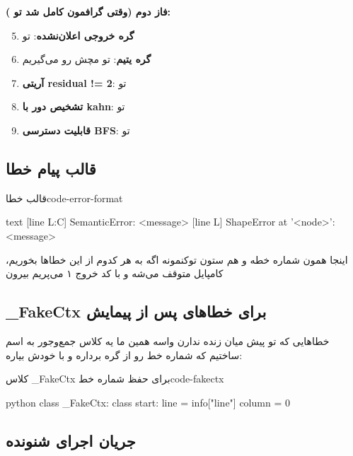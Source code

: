 \documentclass{nngraph-fa}
\begin{document}
\textbf{فاز دوم (وقتی گرافمون کامل شد تو ):}
\begin{enumerate}
    \setcounter{enumi}{4}
    \item \textbf{گره خروجی اعلان‌نشده}: تو 
    \item \textbf{گره یتیم}: تو  مچش رو می‌گیریم
    \item \textbf{آریتی residual != 2}: تو 
    \item \textbf{تشخیص دور با kahn}: تو 
    \item \textbf{قابلیت دسترسی BFS}: تو 
\end{enumerate}

\subsection{قالب پیام خطا}

\begin{codebox}{قالب خطا}{code-error-format}
\begin{amzcode}{text}
[line L:C] SemanticError: <message>
[line L] ShapeError at '<node>': <message>
\end{amzcode}
\end{codebox}

اینجا  همون شماره خطه و  هم ستون توکنمونه
اگه به هر کدوم از این خطاها بخوریم، کامپایل متوقف می‌شه و با کد خروج ۱ می‌پریم بیرون

\subsection{\_FakeCtx برای خطاهای پس از پیمایش}

خطاهایی که تو  پیش میان  زنده ندارن
واسه همین ما یه کلاس جمع‌وجور به اسم  ساختیم که شماره خط رو از گره برداره و با خودش بیاره:

\begin{codebox}{کلاس \_FakeCtx برای حفظ شماره خط}{code-fakectx}
\begin{amzcode}{python}
class _FakeCtx:
    class start:
        line   = info["line"]
        column = 0
\end{amzcode}
\end{codebox}

\subsection{جریان اجرای شنونده}
\end{document}
